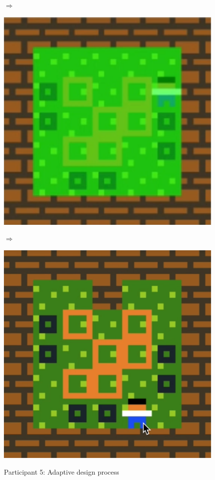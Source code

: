 \begin{figure}[!htbp]
\begin{minipage}[t]{0.25\textwidth}
\end{minipage}
$\Longrightarrow$
\begin{minipage}[t]{0.25\textwidth}
\includegraphics[width=\textwidth]{figures/part5i4_cropped.png} \hfill \\
\end{minipage}
$\Longrightarrow$
\begin{minipage}[t]{0.25\textwidth}
\includegraphics[width=\textwidth]{figures/part5i5.png} \hfill \\
\end{minipage}
\caption{Participant 5: Adaptive design process}
\end{figure}


